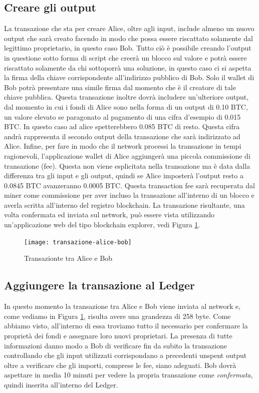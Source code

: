 \subsection*{Creare gli output}
La transazione che sta per creare Alice, oltre agli input, include almeno un nuovo output che sarà creato facendo in modo che possa essere riscattato solamente dal legittimo proprietario, in questo caso Bob. Tutto ciò è possibile creando l'output in questione sotto forma di script che creerà un blocco sul valore e potrà essere riscattato solamente da chi sottoporrà una soluzione, in questo caso ci si aspetta la firma della chiave corrispondente all'indirizzo pubblico di Bob. Solo il wallet di Bob potrà presentare una simile firma dal momento che è il creatore di tale chiave pubblica. 
Questa transazione inoltre dovrà includere un'ulteriore output, dal momento in cui i fondi di Alice sono nella forma di un output di 0.10 BTC, un valore elevato se paragonato al pagamento di una cifra d'esempio di 0.015 BTC. In questo caso ad alice spetterebbero 0.085 BTC di resto. Questa cifra andrà rappresenta il secondo output della transazione che sarà indirizzato ad Alice.
Infine, per fare in modo che il network processi la transazione in tempi ragionevoli, l'applicazione wallet di Alice aggiungerà una piccola commissione di transazione (fee). Questa non viene esplicitata nella transazione ma è data dalla differenza tra gli input e gli output, quindi se Alice imposterà l'output resto a 0.0845 BTC avanzeranno 0.0005 BTC. Questa transaction fee sarà recuperata dal miner come commissione per aver incluso la transazione all'interno di un blocco e averla scritta all'interno del registro blockchain. La transazione risultante, una volta confermata ed inviata sul network, può essere vista utilizzando un'applicazione web del tipo blockchain explorer, vedi Figura \ref{fig:transazione-alice-bob}.
\begin{figure}
	\centering 
	\texttt{[image: transazione-alice-bob]} 
	\caption[Transazionte tra Alice e Bob]{Transazionte tra Alice e Bob}
	\label{fig:transazione-alice-bob} 
\end{figure}

\subsection*{Aggiungere la transazione al Ledger}
In questo momento la transazione tra Alice e Bob viene inviata al network e, come vediamo in Figura \ref{fig:transazione-alice-bob}, risulta avere una grandezza di 258 byte. Come abbiamo visto, all'interno di essa troviamo tutto il necessario per confermare la proprietà dei fondi e assegnare loro nuovi proprietari. La presenza di tutte informazioni danno modo a Bob di verificare fin da subito la transazione controllando che gli input utilizzati corrispondano a precedenti unspent output oltre a verificare che gli importi, comprese le fee, siano adeguati. Bob dovrà aspettare in media 10 minuti per vedere la propria transazione come \textit{confermata}, quindi inserita all'interno del Ledger.

